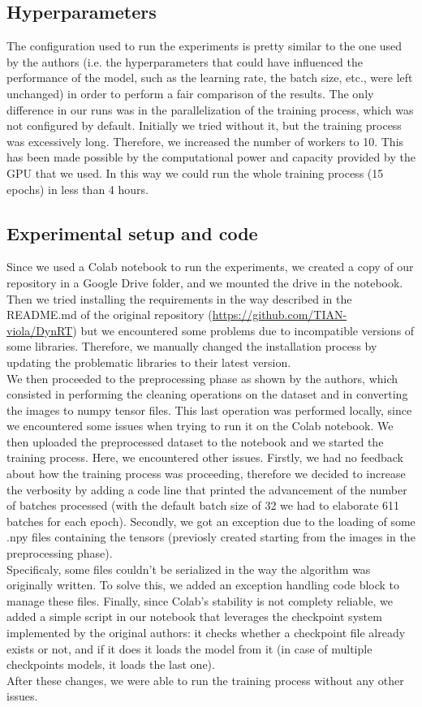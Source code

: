\subsection{Hyperparameters}
The configuration used to run the experiments is pretty similar to the one used by the authors (i.e. the hyperparameters that could have influenced the performance of the model, such as the learning rate, the batch size, etc., were left unchanged) in order to perform a fair comparison of the results. The only difference in our runs was in the parallelization of the training process, which was not configured by default. Initially we tried without it, but the training process was excessively long. Therefore, we increased the number of workers to 10. This has been made possible by the computational power and capacity provided by the GPU that we used. In this way we could run the whole training process (15 epochs) in less than 4 hours. 

\subsection{Experimental setup and code}
Since we used a Colab notebook to run the experiments, we created a copy of our repository in a Google Drive folder, and we mounted the drive in the notebook. Then we tried installing the requirements in the way described in the README.md of the original repository (\url{https://github.com/TIAN-viola/DynRT}) but we encountered some problems due to incompatible versions of some libraries. Therefore, we manually changed the installation process by updating the problematic libraries to their latest version. \\
We then proceeded to the preprocessing phase as shown by the authors, which consisted in performing the cleaning operations on the dataset and in converting the images to numpy tensor files. This last operation was performed locally, since we encountered some issues when trying to run it on the Colab notebook. We then uploaded the preprocessed dataset to the notebook and we started the training process. Here, we encountered other issues. Firstly, we had no feedback about how the training process was proceeding, therefore we decided to increase the verbosity by adding a code line that printed the advancement of the number of batches processed (with the default batch size of 32 we had to elaborate 611 batches for each epoch). Secondly, we got an exception due to the loading of some .npy files containing the tensors (previosly created starting from the images in the preprocessing phase). \\
Specificaly, some files couldn't be serialized in the way the algorithm was originally written. To solve this, we added an exception handling code block to manage these files. Finally, since Colab's stability is not complety reliable, we added a simple script in our notebook that leverages the checkpoint system implemented by the original authors: it checks whether a checkpoint file already exists or not, and if it does it loads the model from it (in case of multiple checkpoints models, it loads the last one). \\
After these changes, we were able to run the training process without any other issues.


